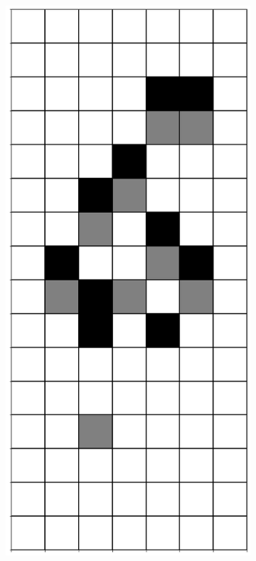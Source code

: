 \documentclass[12pt]{article}
\numberwithin{figure}{section} %
\begin{document}
\begin{figure}[H]
\begin{subfigure}{0.19\textwidth}
     \subcaption{}
   \end{subfigure}
           \begin{subfigure}{0.19\textwidth}
     \centering
     \includegraphics[width=\linewidth]{Section4/19.3}

\end{subfigure}
\end{figure}
\end{document}
